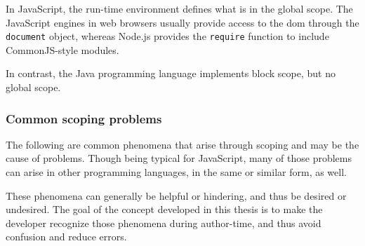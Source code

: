 In JavaScript, the run-time environment defines what is in the global
scope. The JavaScript engines in web browsers usually provide access to
the \ac{dom} through the \texttt{document} object, whereas Node.js
provides the \texttt{require} function to include CommonJS-style
modules.

In contrast, the Java programming language implements block scope, but
no global scope.

\subsubsection{Common scoping problems}\label{common-scoping-problems}

The following are common phenomena that arise through scoping and may be
the cause of problems. Though being typical for JavaScript, many of
those problems can arise in other programming languages, in the same or
similar form, as well.

These phenomena can generally be helpful or hindering, and thus be
desired or undesired. The goal of the concept developed in this thesis
is to make the developer recognize those phenomena during author-time,
and thus avoid confusion and reduce errors.

